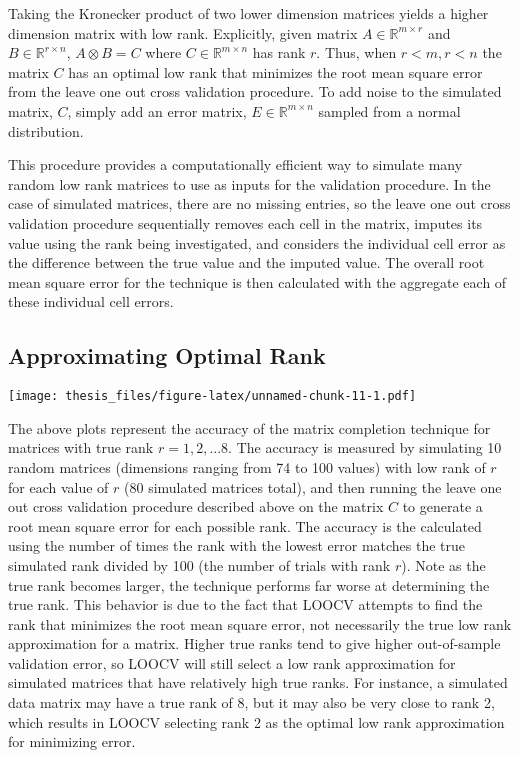 \documentclass[12pt,twoside]{dukestatscithesis}
\theoremstyle{definition}
\theoremstyle{definition}
\theoremstyle{definition}
\theoremstyle{remark}
\begin{document}
Taking the Kronecker product of two lower dimension matrices yields a
higher dimension matrix with low rank. Explicitly, given matrix
\(A \in \mathbb{R}^{m \times r}\) and \(B \in \mathbb{R}^{r \times n}\),
\(A \otimes B = C\) where \(C \in \mathbb{R}^{m \times n}\) has rank
\(r\). Thus, when \(r < m, r < n\) the matrix \(C\) has an optimal low
rank that minimizes the root mean square error from the leave one out
cross validation procedure. To add noise to the simulated matrix, \(C\),
simply add an error matrix, \(E \in \mathbb{R}^{m \times n}\) sampled
from a normal distribution.

This procedure provides a computationally efficient way to simulate many
random low rank matrices to use as inputs for the validation procedure.
In the case of simulated matrices, there are no missing entries, so the
leave one out cross validation procedure sequentially removes each cell
in the matrix, imputes its value using the rank being investigated, and
considers the individual cell error as the difference between the true
value and the imputed value. The overall root mean square error for the
technique is then calculated with the aggregate each of these individual
cell errors.

\subsection{Approximating Optimal
Rank}\label{approximating-optimal-rank}

\texttt{[image: thesis\_files/figure-latex/unnamed-chunk-11-1.pdf]}

The above plots represent the accuracy of the matrix completion
technique for matrices with true rank \(r = 1,2,...8\). The accuracy is
measured by simulating 10 random matrices (dimensions ranging from 74 to
100 values) with low rank of \(r\) for each value of \(r\) (80 simulated
matrices total), and then running the leave one out cross validation
procedure described above on the matrix \(C\) to generate a root mean
square error for each possible rank. The accuracy is the calculated
using the number of times the rank with the lowest error matches the
true simulated rank divided by 100 (the number of trials with rank
\(r\)). Note as the true rank becomes larger, the technique performs far
worse at determining the true rank. This behavior is due to the fact
that LOOCV attempts to find the rank that minimizes the root mean square
error, not necessarily the true low rank approximation for a matrix.
Higher true ranks tend to give higher out-of-sample validation error, so
LOOCV will still select a low rank approximation for simulated matrices
that have relatively high true ranks. For instance, a simulated data
matrix may have a true rank of 8, but it may also be very close to rank
2, which results in LOOCV selecting rank 2 as the optimal low rank
approximation for minimizing error.
\end{document}
